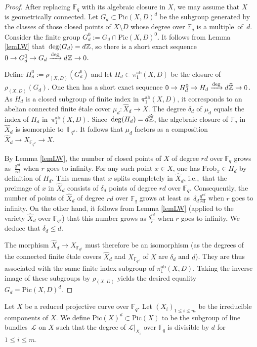 \documentclass{amsart}
\theoremstyle{definition}
\theoremstyle{remark}
\numberwithin{equation}{section}
\newcommand{\ab}{\mathrm{ab}}
\newcommand{\Frob}{\mathrm{Frob}}
\newcommand{\Pic}{\mathrm{Pic}}
\def\ie{i.e.,\ }
\def\Z{\mathbb Z}
\def\F{\mathbb F}
\def\cL{\mathcal{L}}
\def\whX{\widehat{X}}
\begin{document}
\begin{proof}
After replacing $\F_q$ with its algebraic closure in $X$, we may assume that $X$ is geometrically connected. Let $G_d\subset \Pic(X,D)^d$ be the subgroup generated by 
the classes of those closed points of $X\setminus D$ whose degree over $\F_q$ is a multiple~of~$d$.
Consider the finite group $G_d^0:=G_d\cap\Pic(X,D)^0$. It follows from Lemma \ref{lemLW} that~$\deg(G_d)=d\mkern 1mu\Z$, so there is a short exact sequence $0\to G_d^0\to G_d\xrightarrow{\deg}d\mkern 1mu\Z\to 0$.

Define $H_d^0:=\rho_{(X,D)}(G_d^0)$ and let $H_d\subset \pi_1^{\ab}(X,D)$ be the closure of $\rho_{(X,D)}(G_d)$. One then has a short exact sequence $0\to H_d^0\to H_d\xrightarrow{\deg}d\mkern 1mu\widehat{\Z}\to 0$. As $H_d$ is a closed subgroup of finite index in $\pi_1^{\ab}(X,D)$, it corresponds to an abelian connected finite \'etale cover $\mu_d:\whX_d\to X$. The degree $\delta_d$ of $\mu_d$ equals the index of $H_d$ in~$\pi_1^{\ab}(X,D)$. Since~$\deg(H_d)=d\mkern 1mu\widehat{\Z}$, the algebraic closure of $\F_q$ in $\whX_d$ is isomorphic to~$\F_{q^d}$.
It follows that $\mu_d$ factors as a composition $\whX_d\to X_{\F_{q^d}}\to X$.

By Lemma \ref{lemLW}, the number of closed points of $X$ of degree $rd$ over $\F_q$ grows as~$\frac{q^{rd}}{rd}$ when $r$ goes to infinity. For any such point $x\in X$, one has $\Frob_x\in H_d$ by definition of $H_d$. This means that $x$ splits completely in $\whX_d$, \ie that the preimage of $x$ in $\whX_d$ consists of $\delta_d$ points of degree $rd$ over $\F_q$. Consequently, the number of points of $\whX_d$ of degree $rd$ over $\F_q$ grows at least as~$\delta_d\frac{q^{rd}}{rd}$ when $r$ goes to infinity. On the other hand, it follows from Lemma \ref{lemLW} (applied to the variety $\whX_d$ over $\F_{q^d}$) that this number grows as $\frac{q^{rd}}{r}$ when $r$ goes to infinity. We deduce that $\delta_d\leq d$.

The morphism $\whX_d\to X_{\F_{q^d}}$
must therefore be an isomorphism (as the degrees of the connected finite \'etale covers 
$\whX_d$ and $X_{\F_{q^d}}$ of $X$ 
are $\delta_d$ and $d$). They are thus associated with the same finite index subgroup of $\pi_1^{\ab}(X,D)$. Taking the inverse image of these subgroups by $\rho_{(X,D)}$ yields the desired equality $G_d=\Pic(X,D)^d$.
\end{proof}

Let $X$ be a reduced projective curve over $\F_q$. Let $(X_i)_{1\leq i\leq m}$ be the irreducible components of $X$. 
We define $\Pic(X)^d\subset \Pic(X)$ to be the subgroup of line bundles~$\cL$ on $X$ such that the degree of $\cL|_{X_i}$ over $\F_q$ is divisible by $d$ for $1\leq i\leq m$.
\end{document}
